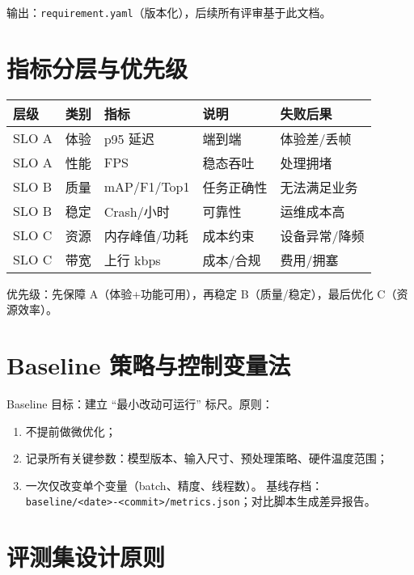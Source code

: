 输出：\passthrough{\lstinline!requirement.yaml!}（版本化），后续所有评审基于此文档。

\section{指标分层与优先级}\label{ux6307ux6807ux5206ux5c42ux4e0eux4f18ux5148ux7ea7}

\begin{longtable}[]{@{}lllll@{}}
\toprule\noalign{}
层级 & 类别 & 指标 & 说明 & 失败后果 \\
\midrule\noalign{}
\endhead
\bottomrule\noalign{}
\endlastfoot
SLO A & 体验 & p95 延迟 & 端到端 & 体验差/丢帧 \\
SLO A & 性能 & FPS & 稳态吞吐 & 处理拥堵 \\
SLO B & 质量 & mAP/F1/Top1 & 任务正确性 & 无法满足业务 \\
SLO B & 稳定 & Crash/小时 & 可靠性 & 运维成本高 \\
SLO C & 资源 & 内存峰值/功耗 & 成本约束 & 设备异常/降频 \\
SLO C & 带宽 & 上行 kbps & 成本/合规 & 费用/拥塞 \\
\end{longtable}

优先级：先保障 A（体验+功能可用），再稳定 B（质量/稳定），最后优化
C（资源效率）。

\section{Baseline
策略与控制变量法}\label{baseline-ux7b56ux7565ux4e0eux63a7ux5236ux53d8ux91cfux6cd5}

Baseline 目标：建立 ``最小改动可运行'' 标尺。原则：

\begin{enumerate}
\def\labelenumi{\arabic{enumi}.}
\tightlist
\item
  不提前做微优化；
\item
  记录所有关键参数：模型版本、输入尺寸、预处理策略、硬件温度范围；
\item
  一次仅改变单个变量（batch、精度、线程数）。
  基线存档：\passthrough{\lstinline!baseline/<date>-<commit>/metrics.json!}；对比脚本生成差异报告。
\end{enumerate}

\section{评测集设计原则}\label{ux8bc4ux6d4bux96c6ux8bbeux8ba1ux539fux5219}

